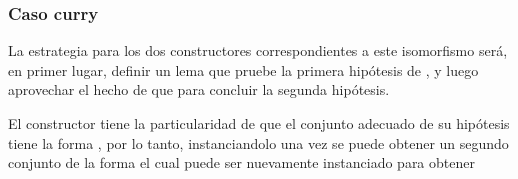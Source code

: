 \documentclass[]{report}
\begin{document}
	\subsubsection{Caso curry}
	
	La estrategia para los dos constructores correspondientes a este isomorfismo será, en primer lugar, definir un lema que pruebe la primera hipótesis de , y luego aprovechar el hecho de que
	\AgdaSpace{}%
	\AgdaSpace{}%
	\AgdaSpace{}%
	\AgdaSpace{}%
	\AgdaSpace{}%
	\AgdaSpace{}%
	\AgdaSpace{}%
	\AgdaSpace{}%
	\AgdaSpace{}%
	\AgdaSpace{}%
	para concluir la segunda hipótesis.
	
	El constructor  tiene la particularidad de que el conjunto adecuado de su hipótesis tiene la forma 
	\AgdaSpace{}%
	\AgdaSpace{}%
	\AgdaSpace{}%
	\AgdaSpace{}%
	\AgdaSpace{}%
	, por lo tanto, instanciandolo una vez se puede obtener un segundo conjunto de la forma
	\AgdaSpace{}%
	\AgdaSpace{}%
	\AgdaSymbol{(}\AgdaSpace{}%
	\AgdaSymbol{(}\AgdaSpace{}%
	\AgdaSpace{}%
	\AgdaSymbol{(}\AgdaSpace{}%
	\AgdaSpace{}%
	\AgdaSymbol{))}\AgdaSpace{}%
	\AgdaSpace{}%
	\AgdaSymbol{)}\AgdaSpace{}%
	\AgdaSpace{}%
	el cual puede ser nuevamente instanciado para obtener
	\AgdaSpace{}%
	\AgdaSpace{}%
	\AgdaSpace{}%
	\AgdaSymbol{(}\AgdaSpace{}%
	\AgdaSpace{}%
	\AgdaSymbol{)}\AgdaSpace{}%
	\AgdaSymbol{(}\AgdaSpace{}%
	\AgdaSymbol{(}\AgdaSpace{}%
	\AgdaSpace{}%
	\AgdaSymbol{(}\AgdaSpace{}%
	\AgdaSpace{}%
	\AgdaSymbol{))}\AgdaSpace{}%
	\AgdaSpace{}%
	\AgdaSymbol{)}
	
\end{document}
